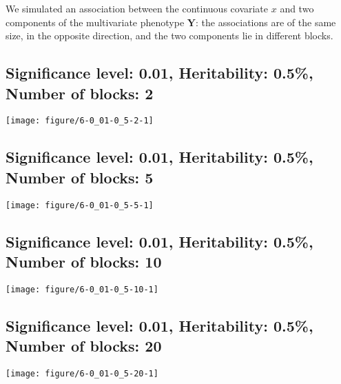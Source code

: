 \documentclass[11pt,letter]{article}\usepackage[]{graphicx}\usepackage[]{color}
\makeatletter
\def\maxwidth{ %
  \ifdim\Gin@nat@width>\linewidth
    \linewidth
  \else
    \Gin@nat@width
  \fi
}
\newenvironment{knitrout}{}{} %
\makeatother
\begin{document}
We simulated an association between the continuous covariate $x$ and two components of the multivariate phenotype $\mathbf{Y}$: the associations are of the same size, in the opposite direction, and the two components lie in different blocks.

\newpage




\subsection{Significance level: 0.01, Heritability: 0.5\%, Number of blocks: 2}

\begin{knitrout}
\color{fgcolor}
\texttt{[image: figure/6-0\_01-0\_5-2-1]} 

\end{knitrout}

\newpage
\subsection{Significance level: 0.01, Heritability: 0.5\%, Number of blocks: 5}

\begin{knitrout}
\color{fgcolor}
\texttt{[image: figure/6-0\_01-0\_5-5-1]} 

\end{knitrout}

\newpage
\subsection{Significance level: 0.01, Heritability: 0.5\%, Number of blocks: 10}

\begin{knitrout}
\color{fgcolor}
\texttt{[image: figure/6-0\_01-0\_5-10-1]} 

\end{knitrout}

\newpage
\subsection{Significance level: 0.01, Heritability: 0.5\%, Number of blocks: 20}

\begin{knitrout}
\color{fgcolor}
\texttt{[image: figure/6-0\_01-0\_5-20-1]} 

\end{knitrout}
\end{document}
